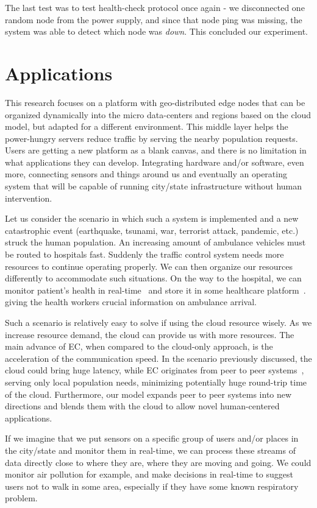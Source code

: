The last test was to test health-check protocol once again - we disconnected one random node from the power supply, and since that node ping was missing, the system was able to detect which node was \emph{down}. This concluded our experiment.
%
%
\section{Applications}\label{sec:app}
%
This research focuses on a platform with geo-distributed edge nodes that can be organized dynamically into the micro data-centers and regions based on the cloud model, but adapted for a different environment. This middle layer helps the power-hungry servers reduce traffic by serving the nearby population requests. Users are getting a new platform as a blank canvas, and there is no limitation in what applications they can develop. Integrating hardware and/or software, even more, connecting sensors and things around us and eventually an operating system that will be capable of running city/state infrastructure without human intervention.

Let us consider the scenario in which such a system is implemented and a new catastrophic event (earthquake, tsunami, war, terrorist attack, pandemic, etc.) struck the human population. An increasing amount of ambulance vehicles must be routed to hospitals fast. Suddenly the traffic control system needs more resources to continue operating properly. We can then organize our resources differently to accommodate such situations. On the way to the hospital, we can monitor patient's health in real-time~\cite{Al-KhafajiyBCAK19} and store it in some healthcare platform~\cite{OmarBBKR19, inproceedingsSimic5}. giving the health workers crucial information on ambulance arrival. 

Such a scenario is relatively easy to solve if using the cloud resource wisely. As we increase resource demand, the cloud can provide us with more resources. The main advance of EC, when compared to the cloud-only approach, is the acceleration of the communication speed. In the scenario previously discussed, the cloud could bring huge latency, while EC originates from peer to peer systems~\cite{LopezMEDHIBFR15}, serving only local population needs, minimizing potentially huge round-trip time of the cloud. Furthermore, our model expands peer to peer systems into new directions and blends them with the cloud to allow novel human-centered applications. 

If we imagine that we put sensors on a specific group of users and/or places in the city/state and monitor them in real-time, we can process these streams of data directly close to where they are, where they are moving and going. We could monitor air pollution for example, and make decisions in real-time to suggest users not to walk in some area, especially if they have some known respiratory problem.

